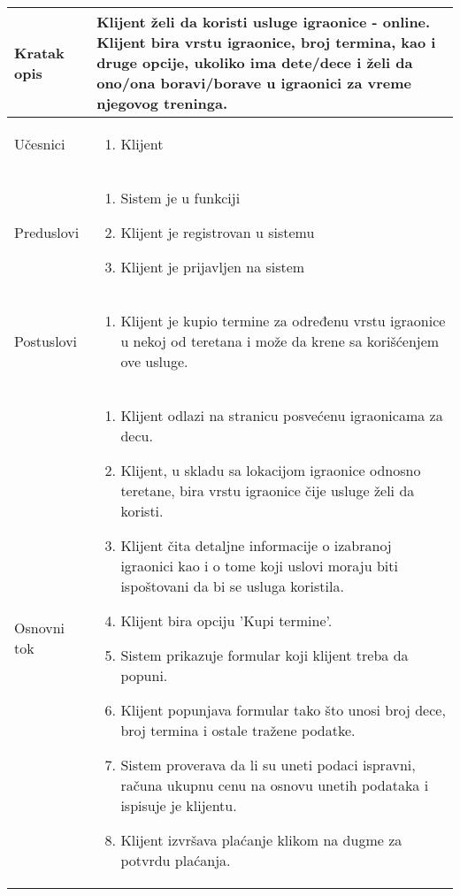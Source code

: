 \documentclass[../../main.tex]{subfiles}
\begin{document}
\begin{longtable}{| p{} | p{} |} 
\hline
    Kratak opis & Klijent želi da koristi usluge igraonice - online. Klijent bira vrstu igraonice, broj termina, kao i druge opcije, ukoliko ima dete/dece i želi da ono/ona boravi/borave u igraonici za vreme njegovog treninga.  \\ 
\hline    
    Učesnici &
    \begin{enumerate}
        \item Klijent
    \end{enumerate}\\
\hline
   Preduslovi &
   \begin{enumerate}
        \item Sistem je u funkciji
        \item Klijent je registrovan u sistemu
        \item Klijent je prijavljen na sistem
    \end{enumerate}\\
\hline  
    Postuslovi & 
    \begin{enumerate}
        \item Klijent je kupio termine za određenu vrstu igraonice u nekoj od teretana i može da krene sa korišćenjem ove usluge.
    \end{enumerate} \\
\hline
    Osnovni tok & 
    \begin{enumerate}
        \item Klijent odlazi na stranicu posvećenu igraonicama za decu.
        \item Klijent, u skladu sa lokacijom igraonice odnosno teretane, bira vrstu igraonice čije usluge želi da koristi.
        \item Klijent čita detaljne informacije o izabranoj igraonici kao i o tome koji uslovi moraju biti ispoštovani da bi se usluga koristila.
        \item Klijent bira opciju 'Kupi termine'.
        \item Sistem prikazuje formular koji klijent treba da popuni.
        \item Klijent popunjava formular tako što unosi broj dece, broj termina i ostale tražene podatke.
        \item Sistem proverava da li su uneti podaci ispravni, računa ukupnu cenu na osnovu unetih podataka i ispisuje je klijentu.
        \item Klijent izvršava plaćanje klikom na dugme za potvrdu plaćanja.

\end{enumerate}
\end{longtable}
\end{document}
